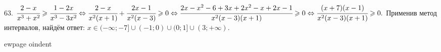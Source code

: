 63. $\cfrac{2-x}{x^3+x^2}\geqslant\cfrac{1-2x}{x^3-3x^2}\Leftrightarrow\cfrac{2-x}{x^2(x+1)}+\cfrac{2x-1}{x^2(x-3)}\geqslant0\Leftrightarrow
\cfrac{2x-x^2-6+3x+2x^2-x+2x-1}{x^2(x-3)(x+1)}\geqslant0\Leftrightarrow\cfrac{(x+7)(x-1)}{x^2(x-3)(x+1)}\geqslant0.$ Применив метод интервалов, найдём ответ: $x\in
(-\infty;-7]\cup(-1;0)\cup(0;1]\cup(3;+\infty).$
\begin{figure}[ht!]
\end{figure}
ewpage
oindent
